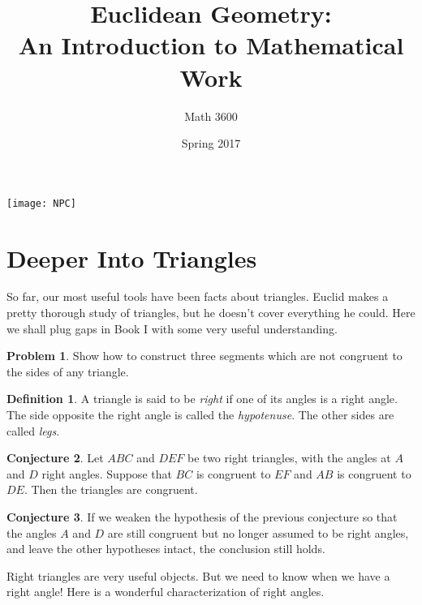 \documentclass{tufte-handout}
\title{Euclidean Geometry:\\An Introduction to Mathematical Work}
\author[]{Math 3600}
\date{Spring 2017}
\theoremstyle{definition}
\newtheorem{problem}{Problem}[section]
\newtheorem{conjecture}[problem]{Conjecture}
\newtheorem*{definition}{Definition}
\begin{document}
\maketitle

\begin{marginfigure}
    \texttt{[image: NPC]}
\end{marginfigure}

\setcounter{section}{7}

\section{Deeper Into Triangles}

So far, our most useful tools have been facts about triangles. Euclid makes a pretty thorough study of triangles, but he doesn't cover everything he could. 
Here we shall plug  gaps in Book I with some very useful understanding.

\begin{problem}
\label{prob:triangle-inequality}
Show how to construct three segments which are not congruent to the sides of any triangle.
\end{problem}


\begin{definition}
\label{defn:right-triangles}
A triangle is said to be \emph{right} if one of its angles is a right angle. 
The side opposite the right angle is called the \emph{hypotenuse}. 
The other sides are called \emph{legs}.
\end{definition}

\begin{conjecture}
\label{conj:RASS}
Let $ABC$ and $DEF$ be two right triangles, with the angles at $A$ and $D$ right angles. 
Suppose that $BC$ is congruent to $EF$ and $AB$ is congruent to $DE$. 
Then the triangles are congruent.
\end{conjecture}

\begin{conjecture}
\label{conj:ASS}
If we weaken the hypothesis of the previous conjecture so that the angles $A$ and $D$ are still congruent but no longer assumed to be right angles, and leave the other hypotheses intact, the conclusion still holds.
\end{conjecture}

Right triangles are very useful objects. 
But we need to know when we have a right angle! 
Here is a wonderful characterization of right angles.
\end{document}
